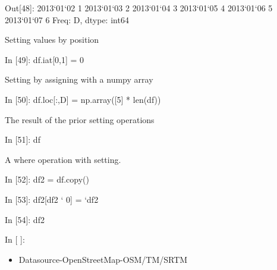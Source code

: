\documentclass[letterpaper,10pt,english]{sphinxmanual}
\def\PYGZgt{\char`\>}
\def\PYGZhy{\char`\-}
\def\PYGZsq{\char`\'}
\renewcommand\PYGZsq{\textquotesingle}
\begin{document}
\begin{OriginalVerbatim}[commandchars=\\\{\}]
\textcolor{nbsphinxout}{Out[48]: }2013\PYGZhy{}01\PYGZhy{}02    1
         2013\PYGZhy{}01\PYGZhy{}03    2
         2013\PYGZhy{}01\PYGZhy{}04    3
         2013\PYGZhy{}01\PYGZhy{}05    4
         2013\PYGZhy{}01\PYGZhy{}06    5
         2013\PYGZhy{}01\PYGZhy{}07    6
         Freq: D, dtype: int64
\end{OriginalVerbatim}

Setting values by position

\begin{OriginalVerbatim}[commandchars=\\\{\}]
\textcolor{nbsphinxin}{In [49]: }df.iat[0,1] = 0
\end{OriginalVerbatim}

Setting by assigning with a numpy array

\begin{OriginalVerbatim}[commandchars=\\\{\}]
\textcolor{nbsphinxin}{In [50]: }df.loc[:,\PYGZsq{}D\PYGZsq{}] = np.array([5] * len(df))
\end{OriginalVerbatim}

The result of the prior setting operations

\begin{OriginalVerbatim}[commandchars=\\\{\}]
\textcolor{nbsphinxin}{In [51]: }df
\end{OriginalVerbatim}

A where operation with setting.

\begin{OriginalVerbatim}[commandchars=\\\{\}]
\textcolor{nbsphinxin}{In [52]: }df2 = df.copy()
\end{OriginalVerbatim}

\begin{OriginalVerbatim}[commandchars=\\\{\}]
\textcolor{nbsphinxin}{In [53]: }df2[df2 \PYGZgt{} 0] = \PYGZhy{}df2
\end{OriginalVerbatim}

\begin{OriginalVerbatim}[commandchars=\\\{\}]
\textcolor{nbsphinxin}{In [54]: }df2
\end{OriginalVerbatim}

\begin{OriginalVerbatim}[commandchars=\\\{\}]
\textcolor{nbsphinxin}{In [ ]: }
\end{OriginalVerbatim}
\begin{itemize}
\item {} 
Datasource-OpenStreetMap-OSM/TM/SRTM

\end{itemize}
\end{document}
